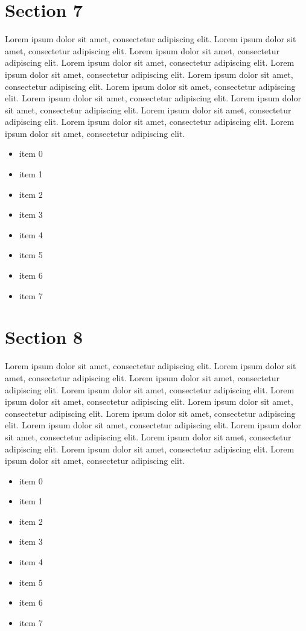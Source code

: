 \documentclass{article}
\begin{document}
\section{Section 7}
Lorem ipsum dolor sit amet, consectetur adipiscing elit. Lorem ipsum dolor sit amet, consectetur adipiscing elit. Lorem ipsum dolor sit amet, consectetur adipiscing elit. Lorem ipsum dolor sit amet, consectetur adipiscing elit. Lorem ipsum dolor sit amet, consectetur adipiscing elit. Lorem ipsum dolor sit amet, consectetur adipiscing elit. Lorem ipsum dolor sit amet, consectetur adipiscing elit. Lorem ipsum dolor sit amet, consectetur adipiscing elit. Lorem ipsum dolor sit amet, consectetur adipiscing elit. Lorem ipsum dolor sit amet, consectetur adipiscing elit. Lorem ipsum dolor sit amet, consectetur adipiscing elit. Lorem ipsum dolor sit amet, consectetur adipiscing elit. 
\begin{itemize}
\item item 0
\item item 1
\item item 2
\item item 3
\item item 4
\item item 5
\item item 6
\item item 7
\end{itemize}

\section{Section 8}
Lorem ipsum dolor sit amet, consectetur adipiscing elit. Lorem ipsum dolor sit amet, consectetur adipiscing elit. Lorem ipsum dolor sit amet, consectetur adipiscing elit. Lorem ipsum dolor sit amet, consectetur adipiscing elit. Lorem ipsum dolor sit amet, consectetur adipiscing elit. Lorem ipsum dolor sit amet, consectetur adipiscing elit. Lorem ipsum dolor sit amet, consectetur adipiscing elit. Lorem ipsum dolor sit amet, consectetur adipiscing elit. Lorem ipsum dolor sit amet, consectetur adipiscing elit. Lorem ipsum dolor sit amet, consectetur adipiscing elit. Lorem ipsum dolor sit amet, consectetur adipiscing elit. Lorem ipsum dolor sit amet, consectetur adipiscing elit. 
\begin{itemize}
\item item 0
\item item 1
\item item 2
\item item 3
\item item 4
\item item 5
\item item 6
\item item 7
\end{itemize}
\end{document}
